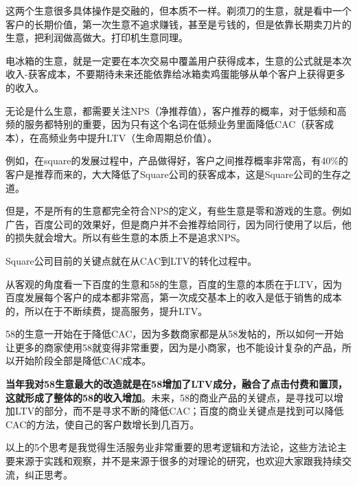 \documentclass[12pt]{article}
\begin{document}
这两个生意很多具体操作是交融的，但本质不一样。剃须刀的生意，就是看中一个客户的长期价值，第一次生意不追求赚钱，甚至是亏钱的，但是依靠长期卖刀片的生意，把利润做高做大。打印机生意同理。

电冰箱的生意，就是一定要在本次交易中覆盖用户获得成本，生意的公式就是本次收入-获客成本，不要期待未来还能依靠给冰箱卖鸡蛋能够从单个客户上获得更多的收入。

无论是什么生意，都需要关注NPS（净推荐值），客户推荐的概率，对于低频和高频的服务都特别的重要，因为只有这个名词在低频业务里面降低CAC（获客成本），在高频业务中提升LTV（生命周期总价值）。

例如，在square的发展过程中，产品做得好，客户之间推荐概率非常高，有40\%的客户是推荐而来的，大大降低了Square公司的获客成本，这是Square公司的生存之道。

但是，不是所有的生意都完全符合NPS的定义，有些生意是零和游戏的生意。例如广告，百度公司的效果好，但是商户并不会推荐给同行，因为同行使用了以后，他的损失就会增大。所以有些生意的本质上不是追求NPS。

Square公司目前的关键点就在从CAC到LTV的转化过程中。

从客观的角度看一下百度的生意和58的生意，百度的生意的本质在于LTV，因为百度发展每个客户的成本都非常高，第一次成交基本上的收入是低于销售的成本的，所以在于不断续费，提高服务，提升LTV。

58的生意一开始在于降低CAC，因为多数商家都是从58发帖的，所以如何一开始让更多的商家使用58就变得非常重要，因为是小商家，也不能设计复杂的产品，所以开始阶段全部是降低CAC成本。

\textbf{当年我对58生意最大的改造就是在58增加了LTV成分，融合了点击付费和置顶，这就形成了整体的58的收入增加}。未来，58的商业产品的关键点，是寻找可以增加LTV的部分，而不是寻求不断的降低CAC；百度的商业关键点是找到可以降低CAC的方法，使自己的客户数增长到几百万。

以上的5个思考是我觉得生活服务业非常重要的思考逻辑和方法论，这些方法论主要来源于实践和观察，并不是来源于很多的对理论的研究，也欢迎大家跟我持续交流，纠正思考。



\end{document}
